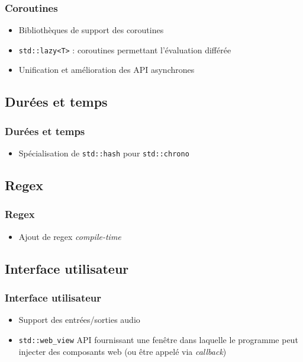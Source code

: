 \documentclass[C++.tex]{subfiles}
\begin{document}
\begin{frame}[fragile]
	\frametitle{Coroutines}
	\begin{itemize}
		\item Bibliothèques de support des coroutines
		\item \lstinline|std::lazy<T>| : coroutines permettant l'évaluation différée
		\item Unification et amélioration des API asynchrones

	\end{itemize}
\end{frame}

\subsection*{Durées et temps}
\begin{frame}[fragile]
	\frametitle{Durées et temps}
	\begin{itemize}
		\item Spécialisation de \lstinline|std::hash| pour \lstinline|std::chrono|
	\end{itemize}
\end{frame}

\subsection*{Regex}
\begin{frame}[fragile]
	\frametitle{Regex}
	\begin{itemize}
		\item Ajout de regex \textit{compile-time}
	\end{itemize}
\end{frame}

\subsection*{Interface utilisateur}
\begin{frame}[fragile]
	\frametitle{Interface utilisateur}
	\begin{itemize}
		\item Support des entrées/sorties audio
		\item \lstinline|std::web_view| API fournissant une fenêtre dans laquelle le programme peut injecter des composants web (ou être appelé via \textit{callback})
	\end{itemize}
\end{frame}
\end{document}
